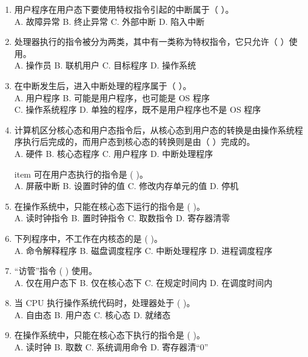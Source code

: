 \documentclass[lang=cn,newtx,10pt,scheme=chinese]{../../elegantbook}
\begin{document}
\begin{enumerate}
  \item 用户程序在用户态下要使用特权指令引起的中断属于（ ）。\\
  A. 故障异常 \quad B. 终止异常 \quad C. 外部中断 \quad D. 陷入中断

  \item 处理器执行的指令被分为两类，其中有一类称为特权指令，它只允许（ ）使用。\\
  A. 操作员 \quad B. 联机用户 \quad C. 目标程序 \quad D. 操作系统

  \item 在中断发生后，进入中断处理的程序属于（ ）。\\
  A. 用户程序 \quad B. 可能是用户程序，也可能是 OS 程序\\
  C. 操作系统程序 \quad D. 单独的程序，既不是用户程序也不是 OS 程序

  \item 计算机区分核心态和用户态指令后，从核心态到用户态的转换是由操作系统程序执行后完成的，而用户态到核心态的转换则是由（ ）完成的。\\
  A. 硬件 \quad B. 核心态程序 \quad C. 用户程序 \quad D. 中断处理程序

  item 可在用户态执行的指令是 (    )。\\
    A. 屏蔽中断 \quad B. 设置时钟的值 \quad C. 修改内存单元的值 \quad D. 停机

    \item 在操作系统中，只能在核心态下运行的指令是 (    )。\\
    A. 读时钟指令 \quad B. 置时钟指令 \quad C. 取数指令 \quad D. 寄存器清零

    \item 下列程序中，不工作在内核态的是 (    )。\\
    A. 命令解释程序 \quad B. 磁盘调度程序 \quad C. 中断处理程序 \quad D. 进程调度程序

    \item “访管”指令 (    ) 使用。\\
    A. 仅在用户态下 \quad B. 仅在核心态下 \quad C. 在规定时间内 \quad D. 在调度时间内

    \item 当 CPU 执行操作系统代码时，处理器处于 (    )。\\
    A. 自由态 \quad B. 用户态 \quad C. 核心态 \quad D. 就绪态

    \item 在操作系统中，只能在核心态下执行的指令是 (    )。\\
    A. 读时钟 \quad B. 取数 \quad C. 系统调用命令 \quad D. 寄存器清“0”


\end{enumerate}
\end{document}
